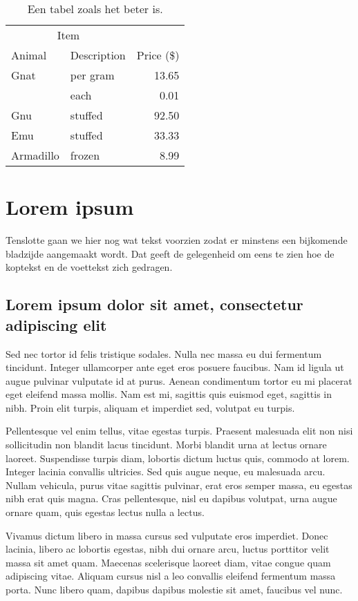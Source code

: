 \begin{table}
  \centering
  \begin{tabular}{@{}llr@{}} \toprule
    \multicolumn{2}{c}{Item} \\ \cmidrule(r){1-2}
    Animal    & Description & Price (\$)\\ \midrule
    Gnat      & per gram    & 13.65 \\
              & each        & 0.01 \\
    Gnu       & stuffed     & 92.50 \\
    Emu       & stuffed     & 33.33 \\
    Armadillo & frozen      & 8.99 \\ \bottomrule
  \end{tabular}
  \caption{Een tabel zoals het beter is.}
  \label{tab:juist}
\end{table}

\section{Lorem ipsum}
Tenslotte gaan we hier nog wat tekst voorzien zodat er minstens een
bijkomende bladzijde aangemaakt wordt. Dat geeft de gelegenheid om eens te
zien hoe de koptekst en de voettekst zich gedragen.

\subsection{Lorem ipsum dolor sit amet, consectetur adipiscing elit}
Sed nec tortor id felis tristique sodales. Nulla nec massa eu dui fermentum
tincidunt. Integer ullamcorper ante eget eros posuere faucibus. Nam id
ligula ut augue pulvinar vulputate id at purus. Aenean condimentum tortor
eu mi placerat eget eleifend massa mollis. Nam est mi, sagittis quis
euismod eget, sagittis in nibh. Proin elit turpis, aliquam et imperdiet
sed, volutpat eu turpis.

Pellentesque vel enim tellus, vitae egestas turpis. Praesent malesuada elit
non nisi sollicitudin non blandit lacus tincidunt. Morbi blandit urna at
lectus ornare laoreet. Suspendisse turpis diam, lobortis dictum luctus
quis, commodo at lorem. Integer lacinia convallis ultricies. Sed quis augue
neque, eu malesuada arcu. Nullam vehicula, purus vitae sagittis pulvinar,
erat eros semper massa, eu egestas nibh erat quis magna. Cras pellentesque,
nisl eu dapibus volutpat, urna augue ornare quam, quis egestas lectus nulla
a lectus.

Vivamus dictum libero in massa cursus sed vulputate eros imperdiet. Donec
lacinia, libero ac lobortis egestas, nibh dui ornare arcu, luctus porttitor
velit massa sit amet quam. Maecenas scelerisque laoreet diam, vitae congue
quam adipiscing vitae. Aliquam cursus nisl a leo convallis eleifend
fermentum massa porta. Nunc libero quam, dapibus dapibus molestie sit amet,
faucibus vel nunc.

